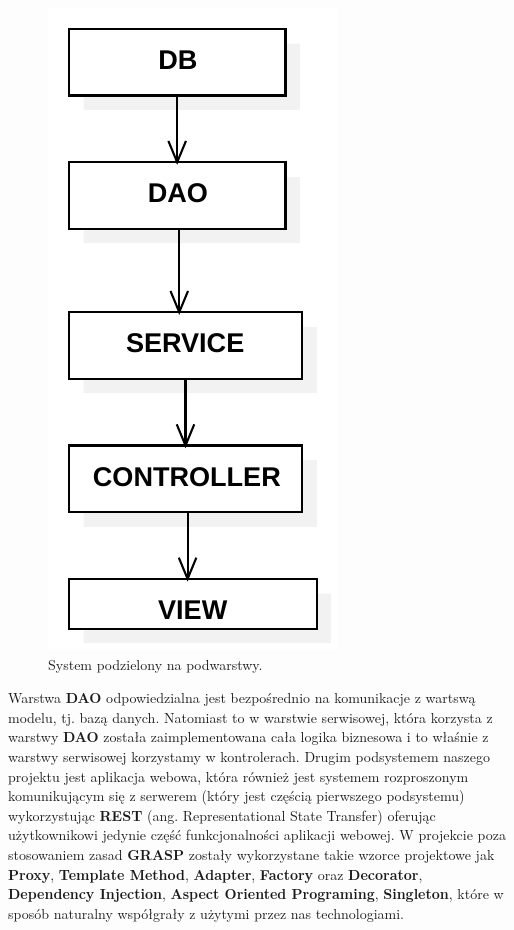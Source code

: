 \documentclass[a4paper]{article}
\begin{document}
\begin{figure}[H]
  \centering
  \includegraphics[scale=0.6]{diagram1.pdf}
  \caption{System podzielony na podwarstwy.}
\end{figure}
Warstwa \textbf{DAO} odpowiedzialna jest bezpośrednio na komunikacje z wartswą modelu, tj. bazą danych. Natomiast to w warstwie serwisowej, która korzysta z warstwy \textbf{DAO} została zaimplementowana cała logika biznesowa i to właśnie z warstwy serwisowej korzystamy w kontrolerach.
\linebreak
Drugim podsystemem naszego projektu jest aplikacja webowa, która również jest systemem rozproszonym komunikującym się z serwerem (który jest częścią pierwszego podsystemu) wykorzystując \textbf{REST} (ang. Representational State Transfer) oferując użytkownikowi jedynie część funkcjonalności aplikacji webowej.
\linebreak
W projekcie poza stosowaniem zasad \textbf{GRASP} zostały wykorzystane takie wzorce projektowe jak \textbf{Proxy}, \textbf{Template Method}, \textbf{Adapter}, \textbf{Factory} oraz \textbf{Decorator}, \textbf{Dependency Injection}, \textbf{Aspect Oriented Programing}, \textbf{Singleton}, które w sposób naturalny współgrały z użytymi przez nas technologiami.
\end{document}
